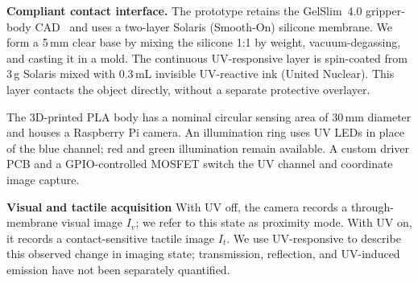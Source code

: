 \documentclass[letterpaper,10pt,conference]{ieeeconf}
\begin{document}
\noindent\textbf{Compliant contact interface.} The prototype retains the GelSlim~4.0 gripper-body CAD~\cite{sipos2024gelslim4,gelslim4hardware} and uses a two-layer Solaris (Smooth-On) silicone membrane. We form a 5\,mm clear base by mixing the silicone 1:1 by weight, vacuum-degassing, and casting it in a mold. The continuous UV-responsive layer is spin-coated from 3\,g Solaris mixed with 0.3\,mL invisible UV-reactive ink (United Nuclear). This layer contacts the object directly, without a separate protective overlayer.\unskip

The 3D-printed PLA body has a nominal circular sensing area of 30\,mm diameter and houses a Raspberry Pi camera. An illumination ring uses UV LEDs in place of the blue channel; red and green illumination remain available. A custom driver PCB and a GPIO-controlled MOSFET switch the UV channel and coordinate image capture. \unskip



\noindent\textbf{Visual and tactile acquisition} With UV off, the camera records a through-membrane visual image $I_v$; we refer to this state as proximity mode. With UV on, it records a contact-sensitive tactile image $I_t$. We use UV-responsive to describe this observed change in imaging state; transmission, reflection, and UV-induced emission have not been separately quantified.\unskip
\end{document}
